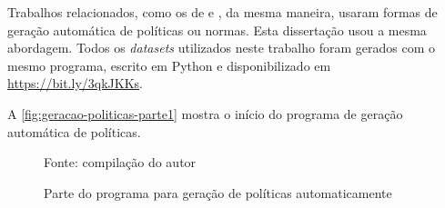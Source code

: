 Trabalhos relacionados, como os de \cite{sarkis2017} e \cite{eduardo2017}, da mesma maneira, usaram formas de geração automática de políticas ou normas. Esta dissertação usou a mesma abordagem. Todos os \textit{datasets} utilizados neste trabalho foram gerados com o mesmo programa, escrito em Python e disponibilizado em \hyperlink{https://bit.ly/3qkJKKs}{https://bit.ly/3qkJKKs}.


A \autoref{fig:geracao-politicas-parte1} mostra o início do programa de geração automática de políticas.
\begin{figure}[h!]
	\centering
	\caption{Parte do programa para geração de políticas automaticamente}
	
	\label{fig:geracao-politicas-parte1}
	{\scriptsize Fonte: compilação do autor}
\end{figure}


